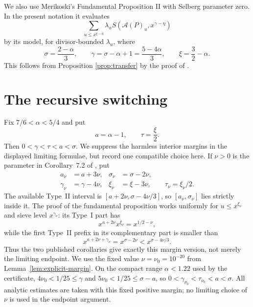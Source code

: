 \documentclass[10pt,reqno]{amsart}
\newcommand{\Acal}{\mathcal{A}}
\newcommand{\1}{\mathbf{1}}
\theoremstyle{plain}
\theoremstyle{remark}
\begin{document}
We also use Merikoski's Fundamental Proposition II with Selberg parameter
zero.  In the present notation it evaluates
\begin{equation}\label{eq:fundamentalII}
  \sum_{u\le x^{\xi-\eta}}\lambda_u
  S(\Acal(P)_u,x^{\gamma-\eta})
\end{equation}
by its model, for divisor-bounded $\lambda_u$, where
\begin{equation}\label{eq:parameters}
  \sigma=\frac{2-\alpha}{3},\qquad
  \gamma=\sigma-\alpha+1=\frac{5-4\alpha}{3},\qquad
  \xi=\frac32-\alpha.
\end{equation}
This follows from Proposition \ref{prop:transfer} by the proof of
\cite[Proposition 6]{Merikoski2020}.

\section{The recursive switching}\label{sec:switching}

Fix $7/6<\alpha<5/4$ and put
\[
  a=\alpha-1,\qquad \tau=\frac{\xi}{2}.
\]
Then $0<\gamma<\tau<a<\sigma$.  We suppress the harmless interior margins
in the displayed limiting formulae, but record one compatible choice here.
If $\nu>0$ is the parameter in Corollary~7.2 of
\cite{GrimmeltMerikoski2025}, put
\begin{equation}\label{eq:margin-parameters}
 \begin{aligned}
 a_\nu&=a+3\nu, & \sigma_\nu&=\sigma-2\nu,\\
 \gamma_\nu&=\gamma-4\nu,
 &\xi_\nu&=\xi-3\nu,\qquad \tau_\nu=\xi_\nu/2.
 \end{aligned}
\end{equation}
The available Type~II interval is
$[a+2\nu,\sigma-4\nu/3]$, so
$[a_\nu,\sigma_\nu]$ lies strictly inside it.  The proof of the
fundamental proposition works uniformly for $u\le x^{\xi_\nu}$ and sieve
level $x^{\gamma_\nu}$: its Type~I part has
\[
 x^{a+2\nu}x^{\xi_\nu}=x^{1/2-\nu},
\]
while the first Type~II prefix in its complementary part is smaller than
\[
 x^{a+2\nu+\gamma_\nu}=x^{\sigma-2\nu}
   <x^{\sigma-4\nu/3}.
\]
Thus the two published corollaries give exactly this margin version, not
merely the limiting endpoint.  We use the fixed value
$\nu=\nu_0=10^{-20}$ from Lemma~\ref{lem:explicit-margin}.  On the compact
range $\alpha<1.22$ used by the certificate,
$4\nu_0<1/25\le\gamma$ and $5\nu_0<1/25\le\sigma-a$, so
$0<\gamma_{\nu_0}<\tau_{\nu_0}<a<\sigma$.  All analytic estimates are taken
with this fixed positive margin; no limiting choice of $\nu$ is used in the
endpoint argument.
\end{document}
